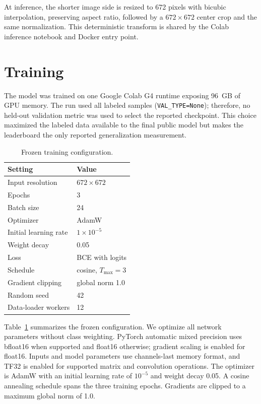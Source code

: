 \documentclass[10pt,twocolumn]{article}
\begin{document}
At inference, the shorter image side is resized to 672 pixels with bicubic
interpolation, preserving aspect ratio, followed by a $672\!\times\!672$ center
crop and the same normalization. This deterministic transform is shared by the
Colab inference notebook and Docker entry point.

\section{Training}
The model was trained on one Google Colab G4 runtime exposing 96~GB of GPU
memory. The run used all labeled samples (\texttt{VAL\_TYPE=None}); therefore,
no held-out validation metric was used to select the reported checkpoint. This
choice maximized the labeled data available to the final public model but makes
the leaderboard the only reported generalization measurement.

\begin{table}[t]
\centering
\caption{Frozen training configuration.}
\label{tab:training}
\small
\begin{tabular}{@{}ll@{}}
\toprule
Setting & Value \\
\midrule
Input resolution & $672\times672$ \\
Epochs & 3 \\
Batch size & 24 \\
Optimizer & AdamW \\
Initial learning rate & $1\times10^{-5}$ \\
Weight decay & 0.05 \\
Loss & BCE with logits \\
Schedule & cosine, $T_{\max}=3$ \\
Gradient clipping & global norm 1.0 \\
Random seed & 42 \\
Data-loader workers & 12 \\
\bottomrule
\end{tabular}
\end{table}

Table~\ref{tab:training} summarizes the frozen configuration. We optimize all
network parameters without class weighting. PyTorch automatic mixed precision
uses bfloat16 when supported and float16 otherwise; gradient scaling is enabled
for float16. Inputs and model parameters use channels-last memory format, and
TF32 is enabled for supported matrix and convolution operations. The optimizer
is AdamW with an initial learning rate of $10^{-5}$ and weight decay 0.05. A
cosine annealing schedule spans the three training epochs. Gradients are clipped
to a maximum global norm of 1.0.
\end{document}
